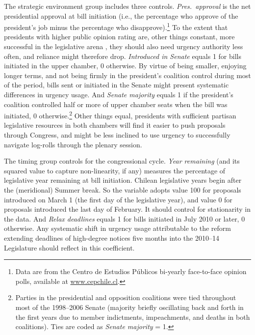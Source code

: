 \documentclass[letter,12pt]{article}
\begin{document}
The strategic environment group includes three controls. \emph{Pres.~approval} is the net presidential approval at bill initiation (i.e., the percentage who approve of the president's job minus the percentage who disapprove).\footnote{Data are from the Centro de Estudios Públicos bi-yearly face-to-face opinion polls, available at \url{www.cepchile.cl}.} To the extent that presidents with higher public opinion rating are, other things constant, more successful in the legislative arena \citep{bond.fleisher.1990,aleman.navia.UrgChi.2009}, they should also need urgency authority less often, and reliance might therefore drop. \emph{Introduced in Senate} equals 1 for bills initiated in the upper chamber, 0 otherwise. By virtue of being smaller, enjoying longer terms, and not being firmly in the president's coalition control during most of the period, bills sent or initiated in the Senate might present systematic differences in urgency usage. And \emph{Senate majority} equals 1 if the president's coalition controlled half or more of upper chamber seats when the bill was initiated, 0 otherwise.\footnote{Parties in the presidential and opposition coalitions were tied throughout most of the 1998--2006 Senate (majority briefly oscillating back and forth in the first years due to member indictments, impeachments, and deaths in both coalitions). Ties are coded as \emph{Senate majority} = 1.} Other things equal, presidents with sufficient partisan legislative resources in both chambers will find it easier to push proposals through Congress, and might be less inclined to use urgency to successfully navigate log-rolls through the plenary session.

The timing group controls for the congressional cycle. \emph{Year remaining} (and its squared value to capture non-linearity, if any) measures the percentage of legislative year remaining at bill initiation. Chilean legislative years begin after the (meridional) Summer break. So the variable adopts value 100 for proposals introduced on March 1 (the first day of the legislative year), and value 0 for proposals introduced the last day of February. It should control for stationarity in the data. And \emph{Relax deadlines} equals 1 for bills initiated in July 2010 or later, 0 otherwise. Any systematic shift in urgency usage attributable to the reform extending deadlines of high-degree notices five months into the 2010--14 Legislature should reflect in this coefficient. 

\end{document}
